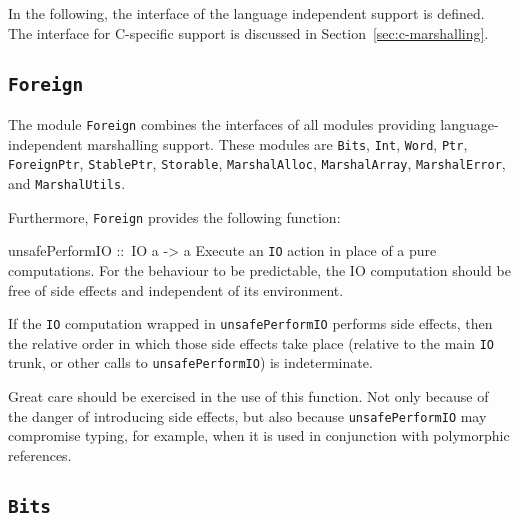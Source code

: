 \documentclass[a4paper,twoside]{article}
\makeatletter
\newcommand{\code}[1]{\texttt{#1}}      %
\newenvironment{codedesc}{%
  \list{}{\labelwidth\z@
    \let\makelabel\codedesclabel}
  }{%
  \endlist
  }
\newcommand*{\codedesclabel}[1]{%
  \hspace{-\leftmargin}
  \parbox[b]{\labelwidth}{\makebox[0pt][l]{\code{#1}}\\}\hfil\relax
  }
\makeatother
\begin{document}
In the following, the interface of the language independent support is
defined.  The interface for C-specific support is discussed in
Section~\ref{sec:c-marshalling}. 

\subsection{\code{Foreign}}
\label{sec:Foreign}

The module \code{Foreign} combines the interfaces of all modules providing
language-independent marshalling support.  These modules are \code{Bits},
\code{Int}, \code{Word}, \code{Ptr}, \code{ForeignPtr}, \code{StablePtr},
\code{Storable}, \code{MarshalAlloc}, \code{MarshalArray},
\code{MarshalError}, and \code{MarshalUtils}.

Furthermore, \code{Foreign} provides the following function:
%
\begin{codedesc}
\item[unsafePerformIO ::\ IO a -> a] Execute an \code{IO} action in place of a
  pure computations.  For the behaviour to be predictable, the IO computation
  should be free of side effects and independent of its environment.
  
  If the \code{IO} computation wrapped in \code{unsafePerformIO} performs side
  effects, then the relative order in which those side effects take place
  (relative to the main \code{IO} trunk, or other calls to
  \code{unsafePerformIO}) is indeterminate.
  
  Great care should be exercised in the use of this function.  Not only
  because of the danger of introducing side effects, but also because
  \code{unsafePerformIO} may compromise typing, for example, when it is used
  in conjunction with polymorphic references.
\end{codedesc}

\subsection{\code{Bits}}
\end{document}
